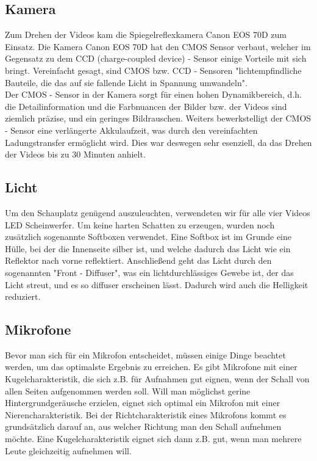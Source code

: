 \subsection{Kamera}
\renewcommand{\kapitelautor}{Autor: Kerstin Schön}
Zum Drehen der Videos kam die Spiegelreflexkamera Canon EOS 70D zum Einsatz. Die Kamera Canon EOS 70D hat den CMOS Sensor verbaut, welcher im Gegensatz zu dem CCD (charge-coupled device) - Sensor einige Vorteile mit sich bringt. Vereinfacht gesagt, sind CMOS bzw. CCD - Sensoren "lichtempfindliche Bauteile, die das auf sie fallende Licht in Spannung umwandeln". \\
Der CMOS - Sensor in der Kamera sorgt für einen hohen Dynamikbereich, d.h. die Detailinformation und die Farbnuancen der Bilder bzw. der Videos sind ziemlich präzise, und ein geringes Bildrauschen. Weiters bewerkstelligt der CMOS - Sensor eine verlängerte Akkulaufzeit, was durch den vereinfachten Ladungstransfer ermöglicht wird. Dies war deswegen sehr esenziell, da das Drehen der Videos bis zu 30 Minuten anhielt.

\subsection{Licht}
\renewcommand{\kapitelautor}{Autor: Kerstin Schön}
Um den Schauplatz genügend auszuleuchten, verwendeten wir für alle vier Videos LED Scheinwerfer. Um keine harten Schatten zu erzeugen, wurden noch zusätzlich sogenannte Softboxen verwendet. Eine Softbox ist im Grunde eine Hülle, bei der die Innenseite silber ist, und welche dadurch das Licht wie ein Reflektor nach vorne reflektiert. Anschließend geht das Licht durch den sogenannten "Front - Diffuser", was ein lichtdurchlässiges Gewebe ist, der das Licht streut, und es so diffuser erscheinen lässt. Dadurch wird auch die Helligkeit reduziert.

\subsection{Mikrofone}
\renewcommand{\kapitelautor}{Autor: Kerstin Schön}
Bevor man sich für ein Mikrofon entscheidet, müssen einige Dinge beachtet werden, um das optimalste Ergebnis zu erreichen. Es gibt Mikrofone mit einer Kugelcharakteristik, die sich z.B. für Aufnahmen gut eignen, wenn der Schall von allen Seiten aufgenommen werden soll. Will man möglichst gerine Hintergrundgeräusche erzielen, eignet sich optimal ein Mikrofon mit einer Nierencharakteristik. 
Bei der Richtcharakteristik eines Mikrofons kommt es grundsätzlich darauf an, aus welcher Richtung man den Schall aufnehmen möchte. Eine Kugelcharakteristik eignet sich dann z.B. gut, wenn man mehrere Leute gleichzeitig aufnehmen will. 

